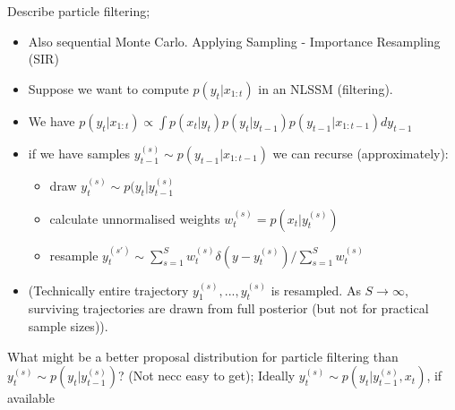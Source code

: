 \documentclass{article}
\begin{document}
Describe particle filtering; \begin{itemize} \item Also sequential Monte Carlo. Applying Sampling - Importance Resampling (SIR) \item Suppose we want to compute $p(y_t | x_{1:t})$ in an NLSSM (filtering). \item We have $p(y_t|x_{1:t}) \propto \int p(x_t|y_t)p(y_t|y_{t-1})p(y_{t-1}|x_{1:t-1})dy_{t-1}$ \item if we have samples $y_{t-1}^{(s)}\sim p(y_{t-1}|x_{1:t-1})$ we can recurse (approximately): \begin{itemize} \item draw $y_t^{(s)} \sim p(y_t|y_{t-1}^{(s)}$ \item calculate unnormalised weights $w_t^{(s)}=p(x_t|y_t^{(s)})$ \item resample $y_t^{(s')} \sim \sum_{s=1}^S w_t^{(s)}\delta (y-y_t^{(s)})/\sum_{s=1}^Sw_t^{(s)}$ \end{itemize} \item (Technically entire trajectory $y_1^{(s)}, ..., y_t^{(s)}$ is resampled. As $S\to\infty$, surviving trajectories are drawn from full posterior (but not for practical sample sizes)). \end{itemize}

What might be a better proposal distribution for particle filtering than $y^{(s)}_t \sim p(y_t|y^{(s)}_{t-1})$? (Not necc easy to get); Ideally $y^{(s)}_t \sim p(y_t|y^{(s)}_{t-1}, x_t)$, if available
\end{document}
